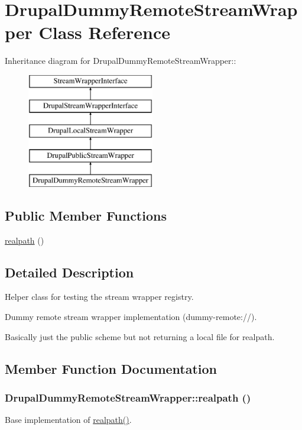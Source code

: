 \hypertarget{classDrupalDummyRemoteStreamWrapper}{
\section{DrupalDummyRemoteStreamWrapper Class Reference}
\label{classDrupalDummyRemoteStreamWrapper}
}
Inheritance diagram for DrupalDummyRemoteStreamWrapper::\begin{figure}[H]
\begin{center}
\leavevmode
\includegraphics[height=5cm]{classDrupalDummyRemoteStreamWrapper}
\end{center}
\end{figure}
\subsection*{Public Member Functions}
\begin{DoxyCompactItemize}
\item 
\hyperlink{classDrupalDummyRemoteStreamWrapper_afda5b6262eed01b4f22523af92ea6f9b}{realpath} ()
\end{DoxyCompactItemize}


\subsection{Detailed Description}
Helper class for testing the stream wrapper registry.

Dummy remote stream wrapper implementation (dummy-\/remote://).

Basically just the public scheme but not returning a local file for realpath. 

\subsection{Member Function Documentation}
\hypertarget{classDrupalDummyRemoteStreamWrapper_afda5b6262eed01b4f22523af92ea6f9b}{
\subsubsection[{realpath}]{\setlength{\rightskip}{0pt plus 5cm}DrupalDummyRemoteStreamWrapper::realpath ()}}
\label{classDrupalDummyRemoteStreamWrapper_afda5b6262eed01b4f22523af92ea6f9b}
Base implementation of \hyperlink{classDrupalDummyRemoteStreamWrapper_afda5b6262eed01b4f22523af92ea6f9b}{realpath()}. 

